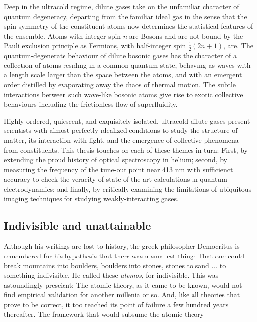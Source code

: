 	Deep in the ultracold regime, dilute gases take on the unfamiliar character of quantum degeneracy, departing from the familiar ideal gas in the sense that the spin-symmetry of the constituent atoms now determines the statistical features of the ensemble. Atoms with integer spin $n$ are Bosons and are not bound by the Pauli exclusion principle as Fermions, with half-integer spin $\frac{1}{2}(2n+1)$, are. The quantum-degenerate behaviour of dilute bosonic gases has the character of a collection of atoms residing in a common quantum state, behaving as waves with a length scale larger than the space between the atoms, and with an emergent order distilled by evaporating away the chaos of thermal motion. The subtle interactions between such wave-like bosonic atoms give rise to exotic collective behaviours including the frictionless flow of superfluidity.

	Highly ordered, quiescent, and exquisitely isolated, ultracold dilute gases present scientists with almost perfectly idealized conditions to study the structure of matter, its interaction with light, and the emergence of collective phenomena from constituents. This thesis touches on each of these themes in turn: First, by extending the proud history of optical spectroscopy in helium; second, by measuring the frequency of the tune-out point near 413 nm with sufficienct accuracy to check the veracity of state-of-the-art calculations in quantum electrodynamics; and finally, by critically examining the limitations of ubiquitous imaging techniques for studying weakly-interacting gases.

\subsection*{Indivisible and unattainable}


	Although his writings are lost to history, the greek philosopher Democritus is remembered for his hypothesis that there was a smallest thing: That one could break mountains into boulders, boulders into stones, stones to sand ... to something indivisible. He called these \emph{atomos}, for indivisible.	This was astoundingly prescient: The atomic theory, as it came to be known, would not find empirical validation for another millenia or so.	And, like all theories that prove to be correct, it too reached its point of failure a few hundred years thereafter. The framework that would subsume the atomic theory 

